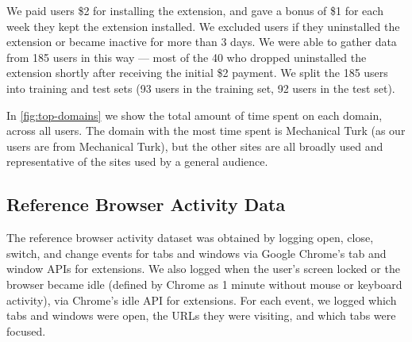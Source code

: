\documentclass{sigchi}
\begin{document}
We paid users \$2 for installing the extension, and gave a bonus of \$1 for each week they kept the extension installed. We excluded users if they uninstalled the extension or became inactive for more than 3 days. We were able to gather data from 185 users in this way --- most of the 40 who dropped uninstalled the extension shortly after receiving the initial \$2 payment. We split the 185 users into training and test sets (93 users in the training set, 92 users in the test set).




In \autoref{fig:top-domains} we show the total amount of time spent on each domain, across all users. The domain with the most time spent is Mechanical Turk (as our users are from Mechanical Turk), but the other sites are all broadly used and representative of the sites used by a general audience.


\subsection{Reference Browser Activity Data}

The reference browser activity dataset was obtained by logging open, close, switch, and change events for tabs and windows via Google Chrome's tab and window APIs for extensions. We also logged when the user's screen locked or the browser became idle (defined by Chrome as 1 minute without mouse or keyboard activity), via Chrome's idle API for extensions. For each event, we logged which tabs and windows were open, the URLs they were visiting, and which tabs were focused.
\end{document}
